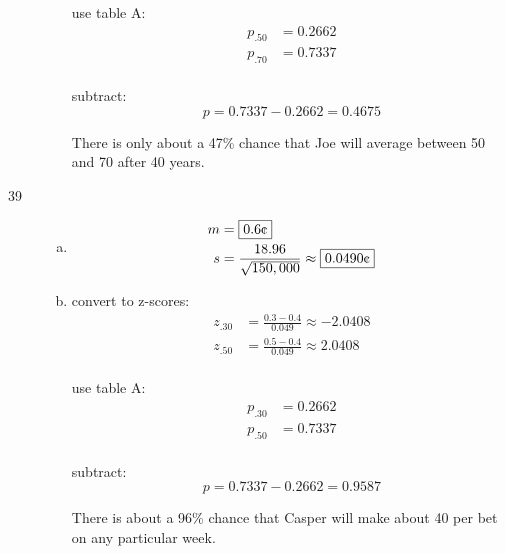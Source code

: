 \documentclass[letterpaper, landscape]{exam}
\newcommand{\cent}{\textcent\xspace}
\begin{document}
\begin{description}
\begin{enumerate}[(a)]
            use table A:
            \begin{align*}
              p_{.50} &= 0.2662 \\
              p_{.70} &= 0.7337 \\
            \end{align*}

            subtract:
            \[
              p = 0.7337 - 0.2662 = \boxed{ 0.4675 }
            \]

            There is only about a 47\% chance that Joe will average between
            50\cent and 70\cent after 40 years.

        \end{enumerate}

      \item[39]
        \begin{enumerate}[(a)]
          \item 
            \begin{align*}
              m &= \boxed{ 0.6 \text{\cent} } \\
              s &= \frac{18.96}{\sqrt{150,000}} \approx 
                \boxed{ 0.0490 \text{\cent}} \\
            \end{align*}
            
          \item
            convert to z-scores:
            \begin{align*}
              z_{.30} &= \frac{0.3 - 0.4}{0.049} \approx -2.0408 \\ 
              z_{.50} &= \frac{0.5 - 0.4}{0.049} \approx 2.0408 \\
            \end{align*}

            use table A:
            \begin{align*}
              p_{.30} &= 0.2662 \\
              p_{.50} &= 0.7337 \\
            \end{align*}

            subtract:
            \[
              p = 0.7337 - 0.2662 = \boxed{ 0.9587 }
            \]

            There is about a 96\% chance that Casper will make about 40\cent per
            bet on any particular week.

        \end{enumerate}


\end{description}
\end{document}
